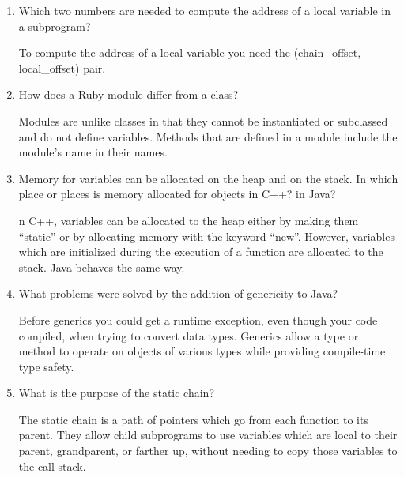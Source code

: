 \begin{enumerate}
  \item Which two numbers are needed to compute
    the address of a local variable in a subprogram?

  \begin{answer}
  To compute the address of a local variable you need the (chain_offset, local_offset) pair.
  \end{answer}

  \item How does a Ruby module differ from a class?

  \begin{answer}
  Modules are unlike classes in that they cannot be instantiated or subclassed
  and do not define variables. Methods that are defined in a module include the
  module’s name in their names.
  \end{answer}

  \item Memory for variables can be allocated on the heap
    and on the stack. In which place or places is memory
    allocated for objects in C++? in Java?

  \begin{answer}
  n C++, variables can be allocated to the heap either by making them “static” or by allocating memory with the keyword “new”. However, variables which are initialized during the execution of a function are allocated to the stack. Java behaves the same way. 
  \end{answer}

  \item What problems were solved by the addition
    of genericity to Java?

  \begin{answer}
  Before generics you could get a runtime exception, even though your code compiled, when trying to convert data types. Generics allow a type or method to operate on objects of various types while providing compile-time type safety.
  \end{answer}

  \item What is the purpose of the static chain?

  \begin{answer}
  The static chain is a path of pointers which go from each function to its parent. They allow child subprograms to use variables which are local to their parent, grandparent, or farther up, without needing to copy those variables to the call stack.
  \end{answer}


\end{enumerate}
